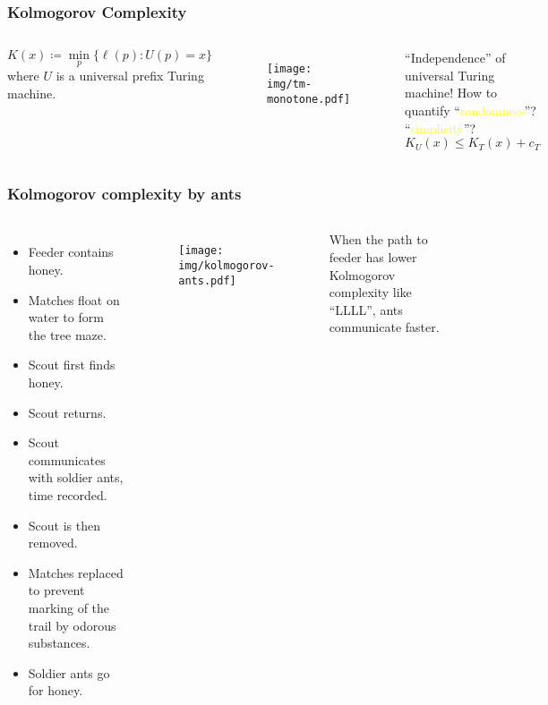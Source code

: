 \documentclass[UTF8,11pt,colorlinks,compress,openany]{beamer}%
\begin{document}
\begin{frame}\frametitle{Kolmogorov Complexity}
\setlength\abovedisplayskip{0pt}
\setlength\belowdisplayskip{0pt}
	\begin{columns}
			\begin{definition}
				\[K(x)\coloneqq \min\limits_p\{\ell(p): U(p)=x\}\]
				where $U$ is a universal prefix Turing machine.
			\end{definition}
\begin{figure}[H]\centering
\texttt{[image: img/tm-monotone.pdf]}
\end{figure}
			``Independence'' of universal Turing machine!
			\centering How to quantify ``\textcolor{yellow}{randomness}''?\\
			``\textcolor{yellow}{simplicity}''?
			\vspace*{3ex}
	\[K_U(x)\leq K_T(x)+c_T\]
	\end{columns}
\end{frame}

\begin{frame}\frametitle{Kolmogorov complexity by ants}
\begin{columns}
\begin{itemize}
	\item Feeder contains honey.
	\item Matches float on water to form the tree maze.
	\item Scout first finds honey.
	\item Scout returns.
	\item Scout communicates with soldier ants, time recorded.
	\item Scout is then removed.
	\item Matches replaced to prevent marking of the trail by odorous substances.
	\item Soldier ants go for honey.
\end{itemize}
\begin{figure}[H]
\texttt{[image: img/kolmogorov-ants.pdf]}
\end{figure}
When the path to feeder has lower Kolmogorov complexity like ``LLLL'', ants communicate faster.
\end{columns}
\end{frame}
\end{document}
